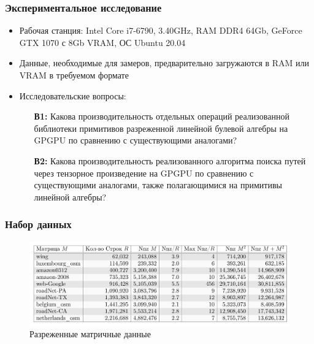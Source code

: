 \documentclass[xcolor=table,english]{beamer}
\begin{document}
\begin{frame}[fragile] \frametitle{Экспериментальное исследование}
    \begin{itemize}
        \item Рабочая станция: Intel Core i7-6790, 3.40GHz, RAM DDR4 64Gb, GeForce GTX 1070 с 8Gb VRAM, ОС Ubuntu 20.04
        \item Данные, необходимые для замеров, предварительно загружаются в RAM или VRAM в требуемом формате
        \item Исследовательские вопросы:
        {
        \begin{itemize}
            \item[\textbf{В1:}] Какова производительность отдельных операций реализованной библиотеки примитивов разреженной линейной булевой алгебры на GPGPU по сравнению с существующими аналогами?
   
           \item[\textbf{В2:}] Какова производительность реализованного алгоритма поиска путей через тензорное произведение на GPGPU  по сравнению с существующими аналогами, также полагающимися на примитивы линейной алгебры?  
        \end{itemize}
        }
    \end{itemize}
\end{frame}

\begin{frame}[fragile] \frametitle{Набор данных}
    \begin{center}
     \begin{minipage}[m]{0.9\linewidth}
        \begin{figure}
            \centering
            \includegraphics[width=1.0\textwidth]{figures/dataset_rq1.png}
            \caption{Разреженные матричные данные}
        \end{figure}
    \end{minipage}\hfill   
    \end{center}
\end{frame}
\end{document}
